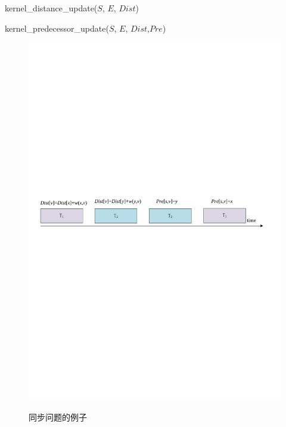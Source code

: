 \begin{algorithm}[t]
\begin{algorithmic}[1]
\caption{\small{kernel\_distance\_update($S$, $E$, $Dist$)}}
\label{KernelDist}
\EndIf
\Return
\end{algorithmic}
\end{algorithm}

\begin{algorithm}[t]
\begin{algorithmic}[1]
\caption{{kernel\_predecessor\_update($S$, $E$, $Dist$,$Pre$)}}
\label{KernelPre}
\EndIf
\Return
\end{algorithmic}
\end{algorithm}

\begin{figure}
\setlength{\belowcaptionskip}{-0.1cm}
  \begin{center}
    {\includegraphics[width=0.8 \textwidth]{figures/SynPro.pdf}}
    \end{center}
  \caption{{\footnotesize{同步问题的例子}}}
  \label{SynPro}
\end{figure}
